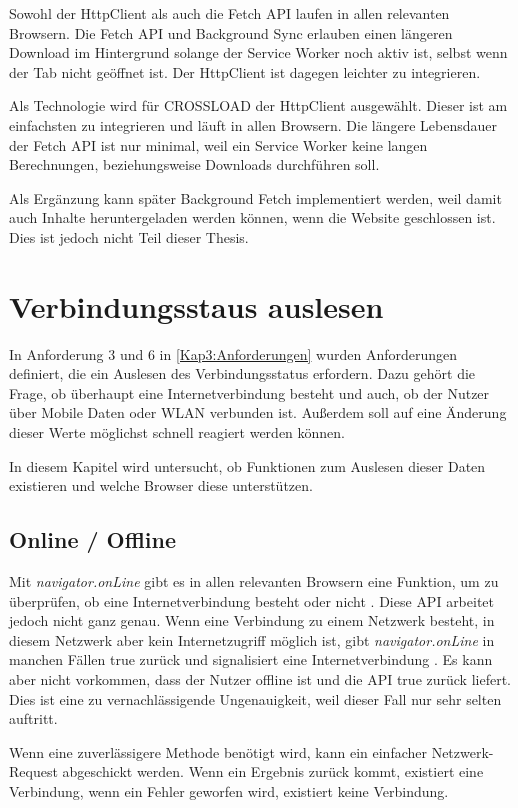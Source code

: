 Sowohl der HttpClient als auch die Fetch \ac{API} laufen in allen relevanten Browsern. Die Fetch \ac{API} und Background Sync erlauben einen längeren Download im Hintergrund solange der Service Worker noch aktiv ist, selbst wenn der Tab nicht geöffnet ist. Der HttpClient ist dagegen leichter zu integrieren.

Als Technologie wird für CROSSLOAD der HttpClient ausgewählt. Dieser ist am einfachsten zu integrieren und läuft in allen Browsern. Die längere Lebensdauer der Fetch \ac{API} ist nur minimal, weil ein Service Worker keine langen Berechnungen, beziehungsweise Downloads durchführen soll.

Als Ergänzung kann später Background Fetch implementiert werden, weil damit auch Inhalte heruntergeladen werden können, wenn die Website geschlossen ist. Dies ist jedoch nicht Teil dieser Thesis.

\section{Verbindungsstaus auslesen}
In Anforderung 3 und 6 in \autoref{Kap3:Anforderungen} wurden Anforderungen definiert, die ein Auslesen des Verbindungsstatus erfordern. Dazu gehört die Frage, ob überhaupt eine Internetverbindung besteht und auch, ob der Nutzer über Mobile Daten oder WLAN verbunden ist. Außerdem soll auf eine Änderung dieser Werte möglichst schnell reagiert werden können.

In diesem Kapitel wird untersucht, ob Funktionen zum Auslesen dieser Daten existieren und welche Browser diese unterstützen. 

\subsection{Online / Offline}
Mit \emph{navigator.onLine} gibt es in allen relevanten Browsern \autocite{caniuse-online} eine Funktion, um zu überprüfen, ob eine Internetverbindung besteht oder nicht \autocite{Sheppard2017} \autocite{mdn-online}. Diese \ac{API} arbeitet jedoch nicht ganz genau. Wenn eine Verbindung zu einem Netzwerk besteht, in diesem Netzwerk aber kein Internetzugriff möglich ist, gibt \emph{navigator.onLine} in manchen Fällen true zurück und signalisiert eine Internetverbindung \autocite{Sheppard2017}. Es kann aber nicht vorkommen, dass der Nutzer offline ist und die \ac{API} true zurück liefert. Dies ist eine zu vernachlässigende Ungenauigkeit, weil dieser Fall nur sehr selten auftritt. 

Wenn eine zuverlässigere Methode benötigt wird, kann ein einfacher Netzwerk-Request abgeschickt werden. Wenn ein Ergebnis zurück kommt, existiert eine Verbindung, wenn ein Fehler geworfen wird, existiert keine Verbindung. 

